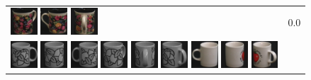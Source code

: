 \begin{figure}[!bp]
\begin{tabular}{m{11cm} | m{3cm} |}
\includegraphics[width=1cm]{coil/beeld-63.eps}
\includegraphics[width=1cm]{coil/beeld-61.eps}
\includegraphics[width=1cm]{coil/beeld-65.eps}
& {\scriptsize 0.0}
\\
\includegraphics[width=1cm]{coil/beeld-48.eps}
\includegraphics[width=1cm]{coil/beeld-50.eps}
\includegraphics[width=1cm]{coil/beeld-49.eps}
\includegraphics[width=1cm]{coil/beeld-51.eps}
\includegraphics[width=1cm]{coil/beeld-53.eps}
\includegraphics[width=1cm]{coil/beeld-52.eps}
\includegraphics[width=1cm]{coil/beeld-37.eps}
\includegraphics[width=1cm]{coil/beeld-38.eps}
\includegraphics[width=1cm]{coil/beeld-40.eps}

\end{tabular}
\end{figure}

